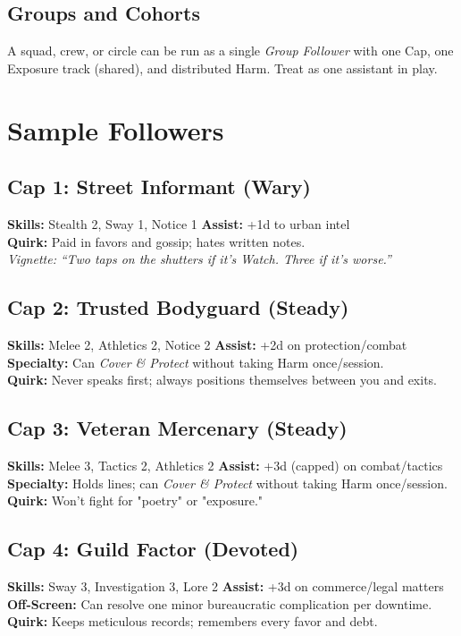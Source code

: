 \subsection*{Groups and Cohorts}
A squad, crew, or circle can be run as a single \emph{Group Follower} with one Cap, one Exposure track (shared), and distributed Harm. Treat as one assistant in play.

\section{Sample Followers}

\subsection*{Cap 1: Street Informant (Wary)}
\textbf{Skills:} Stealth 2, Sway 1, Notice 1 \quad
\textbf{Assist:} +1d to urban intel \\
\textbf{Quirk:} Paid in favors and gossip; hates written notes. \\
\emph{Vignette:} \textit{``Two taps on the shutters if it's Watch. Three if it's worse.''}

\subsection*{Cap 2: Trusted Bodyguard (Steady)}
\textbf{Skills:} Melee 2, Athletics 2, Notice 2 \quad
\textbf{Assist:} +2d on protection/combat \\
\textbf{Specialty:} Can \emph{Cover \& Protect} without taking Harm once/session. \\
\textbf{Quirk:} Never speaks first; always positions themselves between you and exits.

\subsection*{Cap 3: Veteran Mercenary (Steady)}
\textbf{Skills:} Melee 3, Tactics 2, Athletics 2 \quad
\textbf{Assist:} +3d (capped) on combat/tactics \\
\textbf{Specialty:} Holds lines; can \emph{Cover \& Protect} without taking Harm once/session. \\
\textbf{Quirk:} Won't fight for "poetry" or "exposure."

\subsection*{Cap 4: Guild Factor (Devoted)}
\textbf{Skills:} Sway 3, Investigation 3, Lore 2 \quad
\textbf{Assist:} +3d on commerce/legal matters \\
\textbf{Off-Screen:} Can resolve one minor bureaucratic complication per downtime. \\
\textbf{Quirk:} Keeps meticulous records; remembers every favor and debt.

